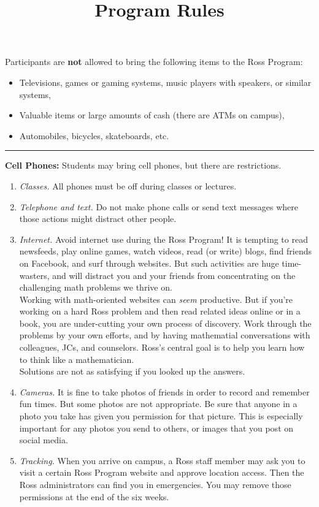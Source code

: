\documentclass{ross}
\title{Program Rules}
\begin{document}
\maketitle
Participants are {\bf not} allowed to bring the following items to the Ross
Program:
\begin{itemize}
\item Televisions, games or gaming systems, music players with speakers, or similar systems,
\item Valuable items or large amounts of cash (there are ATMs on campus),
\item Automobiles, bicycles, skateboards, etc.
\end{itemize}

\bigskip\hrule
\textbf{Cell Phones:} Students may bring cell phones, but there are restrictions. 
\begin{enumerate}[label=(\roman*),itemsep=0.5em,topsep= 0em]

\item {\it Classes.}  All phones must be off during classes or lectures. 

\item {\it Telephone and text.}  Do not make phone calls or send text messages 
where those actions might distract other people.

\item {\it Internet.} Avoid internet use during the Ross Program! 
It is tempting to read newsfeeds, play online games, watch videos, read (or write) blogs, 
find friends on Facebook, and surf through websites.  But such activities are huge time-wasters, 
and will distract you and your friends from concentrating on the challenging math problems we thrive on.  \\[5pt]
Working with math-oriented websites can {\it seem} productive. But if you're working on a 
hard Ross problem and then read related ideas online or in a book, you are under-cutting 
your own process of discovery. Work through the problems by your own efforts, and by having 
mathematial conversations with colleagues, JCs, and counselors.  Ross's central goal is to 
help you learn how to think like a mathematician.\\
\hspace*{1cm} Solutions are not as satisfying if you looked up the answers.

\item {\it Cameras.}  It is fine to take photos of friends in order to record and remember fun times.  
But some photos are not appropriate.  Be sure that anyone in a photo you take has given you permission 
for that picture.  This is especially important for any photos you send to others, or images that you post on social media. 

\item{\it Tracking.}  When you arrive on campus, a Ross staff member
may ask you to visit a certain Ross Program website and approve
location access.  Then the Ross administrators can find you in
emergencies. You may remove those permissions at the end of the six
weeks.
\end{enumerate}
\end{document}
